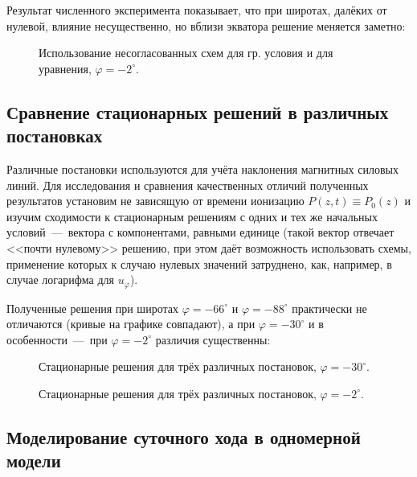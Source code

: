 \documentclass[14pt, a4paper, fleqn]{extarticle}
\begin{document}
Результат численного эксперимента показывает, что при широтах, далёких от нулевой, влияние несущественно, но вблизи экватора решение меняется заметно: 

\begin{figure}[H]
\caption{Использование несогласованных схем для гр. условия и для уравнения, $\varphi = -2^\circ$.}
\end{figure}


\subsection{Сравнение стационарных решений в различных постановках}


Различные постановки используются для учёта наклонения магнитных силовых линий. Для исследования и сравнения качественных отличий полученных результатов установим не зависящую от времени ионизацию $P(z, t) \equiv P_0(z)$ и изучим сходимости к стационарным решениям с одних и тех же начальных условий~---~вектора с компонентами, равными единице (такой вектор отвечает <<почти нулевому>> решению, при этом даёт возможность использовать схемы, применение которых к случаю нулевых значений затруднено, как, например, в случае логарифма для $u_\varphi$). 

Полученные решения при широтах $\varphi = -66^\circ$ и $\varphi = -88^\circ$ практически не отличаются (кривые на графике совпадают), а при $\varphi = -30^\circ$ и в особенности~---~при $\varphi=-2^\circ$ различия существенны:

\begin{figure}[H]
\caption{Стационарные решения для трёх различных постановок, $\varphi = -30^\circ$.}
\end{figure}


\begin{figure}[H]
\caption{Стационарные решения для трёх различных постановок, $\varphi = -2^\circ$.}
\end{figure}



\subsection{Моделирование суточного хода в одномерной модели}
\end{document}
